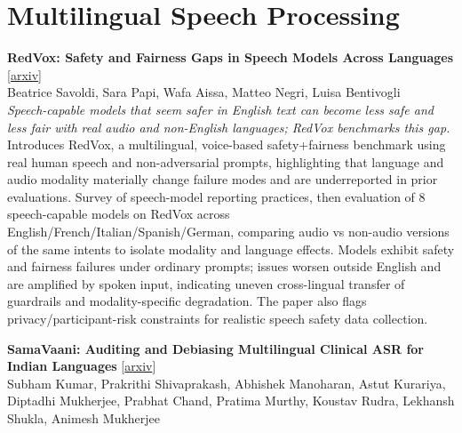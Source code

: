 \documentclass[12pt,letterpaper]{article}
\begin{document}
\medskip


\section*{Multilingual Speech Processing}

{\small\textbf{RedVox: Safety and Fairness Gaps in Speech Models Across Languages}} {\scriptsize[\href{https://arxiv.org/abs/2606.26968}{arxiv}]}\\
{\scriptsize Beatrice Savoldi, Sara Papi, Wafa Aissa, Matteo Negri, Luisa Bentivogli}\\

{\small\textit{Speech-capable models that seem safer in English text can become less safe and less fair with real audio and non-English languages; RedVox benchmarks this gap.}}\\[1pt]
{\footnotesize Introduces RedVox, a multilingual, voice-based safety+fairness benchmark using real human speech and non-adversarial prompts, highlighting that language and audio modality materially change failure modes and are underreported in prior evaluations. Survey of speech-model reporting practices, then evaluation of 8 speech-capable models on RedVox across English/French/Italian/Spanish/German, comparing audio vs non-audio versions of the same intents to isolate modality and language effects. Models exhibit safety and fairness failures under ordinary prompts; issues worsen outside English and are amplified by spoken input, indicating uneven cross-lingual transfer of guardrails and modality-specific degradation. The paper also flags privacy/participant-risk constraints for realistic speech safety data collection.}

\medskip

{\small\textbf{SamaVaani: Auditing and Debiasing Multilingual Clinical ASR for Indian Languages}} {\scriptsize[\href{https://arxiv.org/abs/2606.26901}{arxiv}]}\\
{\scriptsize Subham Kumar, Prakrithi Shivaprakash, Abhishek Manoharan, Astut Kurariya, Diptadhi Mukherjee, Prabhat Chand, Pratima Murthy, Koustav Rudra, Lekhansh Shukla, Animesh Mukherjee}\\
\end{document}
